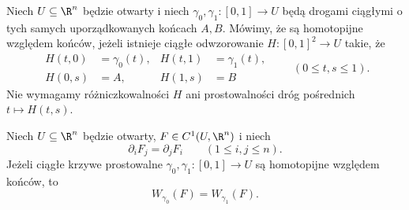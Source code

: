 \begin{definicja}
\label{ma2:def:line-homotopy}
Niech $U\subseteq\R^n$ będzie otwarty i niech
$\gamma_0,\gamma_1:[0,1]\to U$ będą drogami
ciągłymi o tych samych uporządkowanych końcach
$A,B$. Mówimy, że są homotopijne względem końców,
jeżeli istnieje ciągłe odwzorowanie
$H:[0,1]^2\to U$ takie, że
\[
 \begin{aligned}
 H(t,0)&=\gamma_0(t),& H(t,1)&=\gamma_1(t),\\
 H(0,s)&=A,&H(1,s)&=B
 \end{aligned}
 \qquad(0\le t,s\le1).
\]
Nie wymagamy różniczkowalności $H$ ani
prostowalności dróg pośrednich
$t\mapsto H(t,s)$.
\end{definicja}

\begin{twierdzenie}
\label{ma2:thm:line-homotopy-invariance}
Niech $U\subseteq\R^n$ będzie otwarty,
$F\in C^1(U,\R^n)$ i niech
\[
 \partial_iF_j=\partial_jF_i
 \qquad(1\le i,j\le n).
\]
Jeżeli ciągłe krzywe prostowalne
$\gamma_0,\gamma_1:[0,1]\to U$
są homotopijne względem końców, to
\[
 W_{\gamma_0}(F)=W_{\gamma_1}(F).
\]
\end{twierdzenie}
